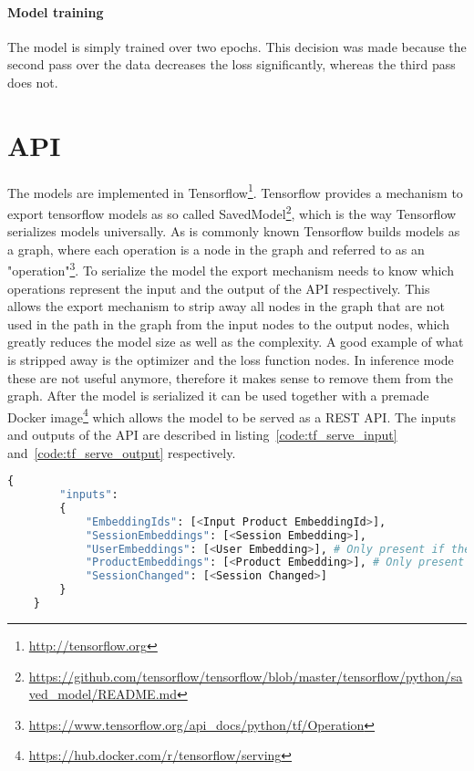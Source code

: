 \paragraph{Model training}
The model is simply trained over two epochs.
This decision was made because the second pass over the data decreases the loss significantly, whereas the third pass does not.

\section{API}\label{sec:api}
The models are implemented in Tensorflow\footnote{\url{http://tensorflow.org}}.
Tensorflow provides a mechanism to export tensorflow models as so called SavedModel\footnote{\url{https://github.com/tensorflow/tensorflow/blob/master/tensorflow/python/saved_model/README.md}}, which is the way Tensorflow serializes models universally.
As is commonly known Tensorflow builds models as a graph, where each operation is a node in the graph and referred to as an "operation"\footnote{\url{https://www.tensorflow.org/api_docs/python/tf/Operation}}.
To serialize the model the export mechanism needs to know which operations represent the input and the output of the API respectively.
This allows the export mechanism to strip away all nodes in the graph that are not used in the path in the graph from the input nodes to the output nodes, which greatly reduces the model size as well as the complexity.
A good example of what is stripped away is the optimizer and the loss function nodes.
In inference mode these are not useful anymore, therefore it makes sense to remove them from the graph.
After the model is serialized it can be used together with a premade Docker image\footnote{\url{https://hub.docker.com/r/tensorflow/serving}} which allows the model to be served as a REST API.
The inputs and outputs of the API are described in listing~\ref{code:tf_serve_input} and~\ref{code:tf_serve_output} respectively.


\begin{minipage}{\linewidth}
    \begin{lstlisting}[language=Python,frame=single,caption=TF Serve API Input,label=code:tf_serve_input]
    {
        "inputs": 
        {
            "EmbeddingIds": [<Input Product EmbeddingId>],
            "SessionEmbeddings": [<Session Embedding>],
            "UserEmbeddings": [<User Embedding>], # Only present if the user layer is used
            "ProductEmbeddings": [<Product Embedding>], # Only present if product embeddings are used
            "SessionChanged": [<Session Changed>]
        }
    }
    \end{lstlisting}
\end{minipage}

